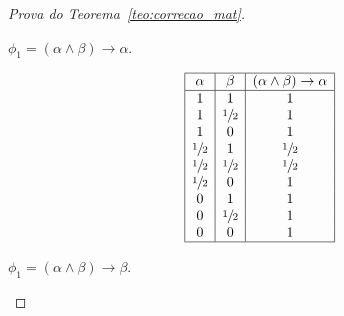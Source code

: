 \begin{proof}[Prova do Teorema~\ref{teo:correcao_mat}]
\begin{provaporcasos}
\begin{provaporsubcasos}
                   

                \subcasodeprova{} $\phi_{1} = (\alpha \land \beta) \to \alpha$. 


                \begin{center}
                    \[
                        \begin{array}{|c|c|c|}%
                            \hline%
                            \alpha      & \beta & (\alpha \land \beta) \to \alpha \\
                            \hline%
                            1 & 1 &                 1\\
                            1 & \meio{} &1\\
                            1 & 0 &1\\
                            \meio{} & 1 &\meio{}\\
                            \meio{} & \meio{} &\meio{}\\
                            \meio{} & 0 &1\\
                            0 & 1 &1\\
                            0 & \meio{} &1\\
                            0 & 0 &1\\
                            \hline%
                        \end{array}
                    \]
                \end{center}
                

                \subcasodeprova{} $\phi_{1} = (\alpha \land \beta) \to \beta$.


\end{provaporsubcasos}
\end{provaporcasos}
\end{proof}
